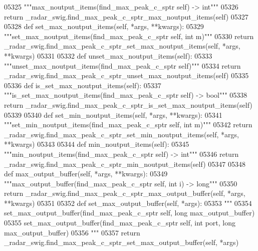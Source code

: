 \begin{DoxyCode}
{{{{{{{{{{{{{{{{{{05325         \textcolor{stringliteral}{"""max\_noutput\_items(find\_max\_peak\_c\_sptr self) -> int"""}
05326         \textcolor{keywordflow}{return} \_radar\_swig.find\_max\_peak\_c\_sptr\_max\_noutput\_items(self)
05327 
05328     \textcolor{keyword}{def }set_max_noutput_items(self, *args, **kwargs):
05329         \textcolor{stringliteral}{"""set\_max\_noutput\_items(find\_max\_peak\_c\_sptr self, int m)"""}
05330         \textcolor{keywordflow}{return} \_radar\_swig.find\_max\_peak\_c\_sptr\_set\_max\_noutput\_items(self, *args, **kwargs)
05331 
05332     \textcolor{keyword}{def }unset_max_noutput_items(self):
05333         \textcolor{stringliteral}{"""unset\_max\_noutput\_items(find\_max\_peak\_c\_sptr self)"""}
05334         \textcolor{keywordflow}{return} \_radar\_swig.find\_max\_peak\_c\_sptr\_unset\_max\_noutput\_items(self)
05335 
05336     \textcolor{keyword}{def }is_set_max_noutput_items(self):
05337         \textcolor{stringliteral}{"""is\_set\_max\_noutput\_items(find\_max\_peak\_c\_sptr self) -> bool"""}
05338         \textcolor{keywordflow}{return} \_radar\_swig.find\_max\_peak\_c\_sptr\_is\_set\_max\_noutput\_items(self)
05339 
05340     \textcolor{keyword}{def }set_min_noutput_items(self, *args, **kwargs):
05341         \textcolor{stringliteral}{"""set\_min\_noutput\_items(find\_max\_peak\_c\_sptr self, int m)"""}
05342         \textcolor{keywordflow}{return} \_radar\_swig.find\_max\_peak\_c\_sptr\_set\_min\_noutput\_items(self, *args, **kwargs)
05343 
05344     \textcolor{keyword}{def }min_noutput_items(self):
05345         \textcolor{stringliteral}{"""min\_noutput\_items(find\_max\_peak\_c\_sptr self) -> int"""}
05346         \textcolor{keywordflow}{return} \_radar\_swig.find\_max\_peak\_c\_sptr\_min\_noutput\_items(self)
05347 
05348     \textcolor{keyword}{def }max_output_buffer(self, *args, **kwargs):
05349         \textcolor{stringliteral}{"""max\_output\_buffer(find\_max\_peak\_c\_sptr self, int i) -> long"""}
05350         \textcolor{keywordflow}{return} \_radar\_swig.find\_max\_peak\_c\_sptr\_max\_output\_buffer(self, *args, **kwargs)
05351 
05352     \textcolor{keyword}{def }set_max_output_buffer(self, *args):
05353         \textcolor{stringliteral}{"""}
05354 \textcolor{stringliteral}{        set\_max\_output\_buffer(find\_max\_peak\_c\_sptr self, long max\_output\_buffer)}
05355 \textcolor{stringliteral}{        set\_max\_output\_buffer(find\_max\_peak\_c\_sptr self, int port, long max\_output\_buffer)}
05356 \textcolor{stringliteral}{        """}
05357         \textcolor{keywordflow}{return} \_radar\_swig.find\_max\_peak\_c\_sptr\_set\_max\_output\_buffer(self, *args)
}}}}}}}}}}}}}}}}}}
\end{DoxyCode}
